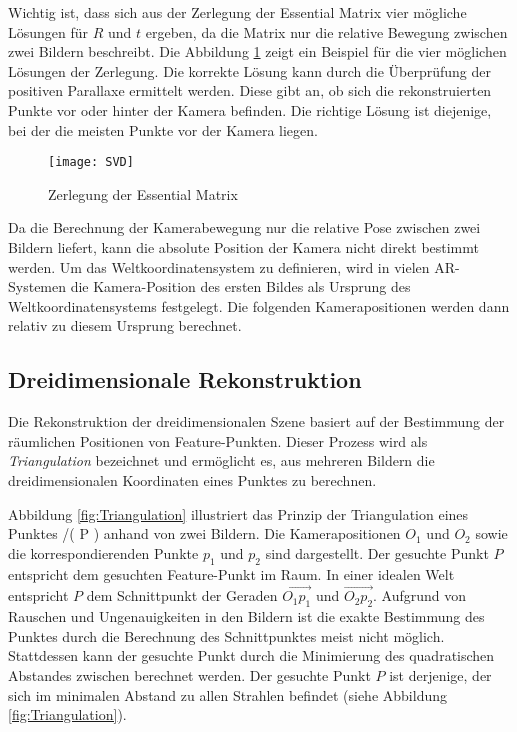 Wichtig ist, dass sich aus der Zerlegung der Essential Matrix vier mögliche Lösungen für \( R \) und \( t \) ergeben, da die Matrix nur die relative Bewegung zwischen zwei Bildern beschreibt. Die Abbildung \ref{fig:SVD} zeigt ein Beispiel für die vier möglichen Lösungen der Zerlegung. Die korrekte Lösung kann durch die Überprüfung der positiven Parallaxe ermittelt werden. Diese gibt an, ob sich die rekonstruierten Punkte vor oder hinter der Kamera befinden. Die richtige Lösung ist diejenige, bei der die meisten Punkte vor der Kamera liegen. \cite{gao2021vSLAM}

\begin{figure}
    \centering
    \texttt{[image: SVD]}
    \caption{Zerlegung der Essential Matrix \cite{gao2021vSLAM}\label{fig:SVD}}\par
\end{figure}

Da die Berechnung der Kamerabewegung nur die relative Pose zwischen zwei Bildern liefert, kann die absolute Position der Kamera nicht direkt bestimmt werden. Um das Weltkoordinatensystem zu definieren, wird in vielen AR-Systemen die Kamera-Position des ersten Bildes als Ursprung des Weltkoordinatensystems festgelegt. Die folgenden Kamerapositionen werden dann relativ zu diesem Ursprung berechnet. \cite{gao2021vSLAM,appledevdoc}

\subsection{Dreidimensionale Rekonstruktion}

Die Rekonstruktion der dreidimensionalen Szene basiert auf der Bestimmung der räumlichen Positionen von Feature-Punkten. Dieser Prozess wird als \emph{Triangulation} bezeichnet und ermöglicht es, aus mehreren Bildern die dreidimensionalen Koordinaten eines Punktes zu berechnen. \cite{gao2021vSLAM}

Abbildung \ref{fig:Triangulation} illustriert das Prinzip der Triangulation eines Punktes /( P ) anhand von zwei Bildern. Die Kamerapositionen \( O_1 \) und \( O_2 \) sowie die korrespondierenden Punkte \( p_1 \) und \( p_2 \) sind dargestellt. Der gesuchte Punkt \( P \) entspricht dem gesuchten Feature-Punkt im Raum. In einer idealen Welt entspricht \( P \) dem Schnittpunkt der Geraden \( \overrightarrow{O_1p_1} \) und \( \overrightarrow{O_2p_2} \). Aufgrund von Rauschen und Ungenauigkeiten in den Bildern ist die exakte Bestimmung des Punktes durch die Berechnung des Schnittpunktes meist nicht möglich. Stattdessen kann der gesuchte Punkt durch die Minimierung des quadratischen Abstandes zwischen berechnet werden. Der gesuchte Punkt \( P \) ist derjenige, der sich im minimalen Abstand zu allen Strahlen befindet (siehe Abbildung \ref{fig:Triangulation}). \cite{gao2021vSLAM}

